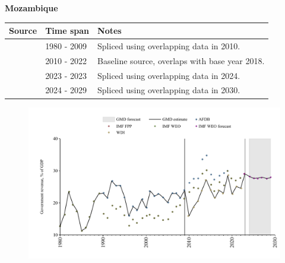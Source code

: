 \documentclass[12pt,a4paper,landscape]{article}
\begin{document}
\begin{adjustbox}{max totalsize={\paperwidth}{\paperheight},center}
\begin{minipage}[t][\textheight][t]{\textwidth}
\vspace*{0.5cm}
{}
\begin{center}
{\Large\bfseries Mozambique}
\end{center}
\vspace{0.5cm}
\begin{table}[H]
\centering
\small
\begin{tabular}{|l|l|l|}
\hline
\textbf{Source} & \textbf{Time span} & \textbf{Notes} \\
\hline
\rowcolor{white}\cite{AFDB}& 1980 - 2009 &Spliced using overlapping data in 2010.\\
\rowcolor{lightgray}\cite{WDI}& 2010 - 2022 &Baseline source, overlaps with base year 2018.\\
\rowcolor{white}\cite{IMF_FPP}& 2023 - 2023 &Spliced using overlapping data in 2024.\\
\rowcolor{lightgray}\cite{IMF_WEO_forecast}& 2024 - 2029 &Spliced using overlapping data in 2030.\\
\hline
\end{tabular}
\end{table}
\begin{figure}[H]
\centering
\includegraphics[width=\textwidth,height=0.6\textheight,keepaspectratio]{graphs/MOZ_govrev_GDP.pdf}
\end{figure}
\end{minipage}
\end{adjustbox}
\end{document}
